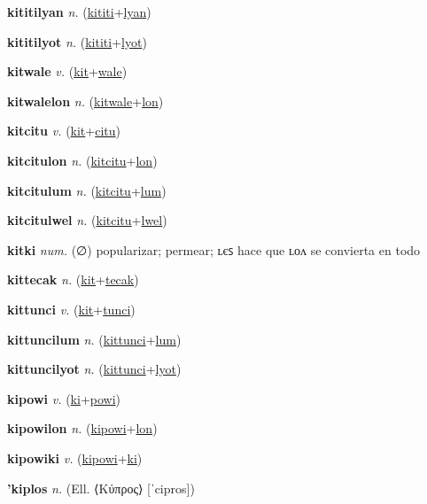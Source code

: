 \textbf{\hypertarget{kititilyan}{kititilyan}} \textit{n.} (\hyperlink{kititi}{kititi}+\allowbreak \hyperlink{lyan}{lyan})


\textbf{\hypertarget{kititilyot}{kititilyot}} \textit{n.} (\hyperlink{kititi}{kititi}+\allowbreak \hyperlink{lyot}{lyot})


\textbf{\hypertarget{kitwale}{kitwale}} \textit{v.} (\hyperlink{kit}{kit}+\allowbreak \hyperlink{wale}{wale})


\textbf{\hypertarget{kitwalelon}{kitwalelon}} \textit{n.} (\hyperlink{kitwale}{kitwale}+\allowbreak \hyperlink{lon}{lon})


\textbf{\hypertarget{kitcitu}{kitcitu}} \textit{v.} (\hyperlink{kit}{kit}+\allowbreak \hyperlink{citu}{citu})


\textbf{\hypertarget{kitcitulon}{kitcitulon}} \textit{n.} (\hyperlink{kitcitu}{kitcitu}+\allowbreak \hyperlink{lon}{lon})


\textbf{\hypertarget{kitcitulum}{kitcitulum}} \textit{n.} (\hyperlink{kitcitu}{kitcitu}+\allowbreak \hyperlink{lum}{lum})


\textbf{\hypertarget{kitcitulwel}{kitcitulwel}} \textit{n.} (\hyperlink{kitcitu}{kitcitu}+\allowbreak \hyperlink{lwel}{lwel})


\textbf{\hypertarget{kitki}{kitki}} \textit{num.} (∅)
popularizar; permear; ʟєꜱ hace que ʟᴏᴧ se convierta en todo

\textbf{\hypertarget{kittecak}{kittecak}} \textit{n.} (\hyperlink{kit}{kit}+\allowbreak \hyperlink{tecak}{tecak})


\textbf{\hypertarget{kittunci}{kittunci}} \textit{v.} (\hyperlink{kit}{kit}+\allowbreak \hyperlink{tunci}{tunci})


\textbf{\hypertarget{kittuncilum}{kittuncilum}} \textit{n.} (\hyperlink{kittunci}{kittunci}+\allowbreak \hyperlink{lum}{lum})


\textbf{\hypertarget{kittuncilyot}{kittuncilyot}} \textit{n.} (\hyperlink{kittunci}{kittunci}+\allowbreak \hyperlink{lyot}{lyot})


\textbf{\hypertarget{kipowi}{kipowi}} \textit{v.} (\hyperlink{ki}{ki}+\allowbreak \hyperlink{powi}{powi})


\textbf{\hypertarget{kipowilon}{kipowilon}} \textit{n.} (\hyperlink{kipowi}{kipowi}+\allowbreak \hyperlink{lon}{lon})


\textbf{\hypertarget{kipowiki}{kipowiki}} \textit{v.} (\hyperlink{kipowi}{kipowi}+\allowbreak \hyperlink{ki}{ki})


\textbf{\hypertarget{'kiplos}{'kiplos}} \textit{n.} (Ell. ⟨Κύπρος⟩ [ˈcipros])


